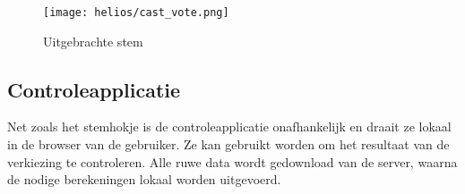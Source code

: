 \begin{figure}
  \centering
  \texttt{[image: helios/cast\_vote.png]}
  \caption{Uitgebrachte stem}
  \label{fig:helios:cast_vote}
\end{figure}

\subsection{Controleapplicatie}
\label{sec:helios:controleapplicatie}

Net zoals het stemhokje is de controleapplicatie onafhankelijk en draait ze lokaal in de browser van de gebruiker. Ze kan gebruikt worden om het resultaat van de verkiezing te controleren. Alle ruwe data wordt gedownload van de server, waarna de nodige berekeningen lokaal worden uitgevoerd.